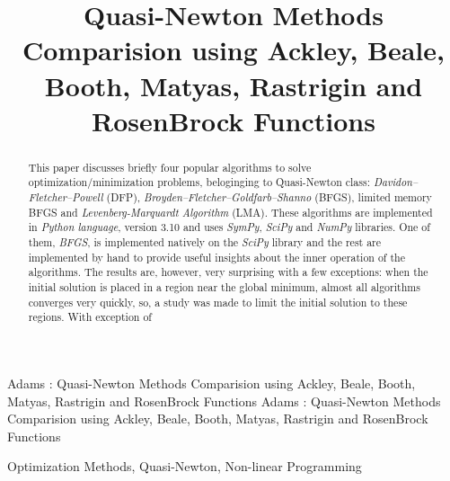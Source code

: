 \documentclass{ieeeaccess}
\begin{document}
\title{Quasi-Newton Methods Comparision using Ackley, Beale, Booth, Matyas, Rastrigin and RosenBrock Functions}
\author{
}

\markboth
{Adams \headeretal: Quasi-Newton Methods Comparision using Ackley, Beale, Booth, Matyas, Rastrigin and RosenBrock Functions}
{Adams \headeretal: Quasi-Newton Methods Comparision using Ackley, Beale, Booth, Matyas, Rastrigin and RosenBrock Functions}

\begin{abstract}
This paper discusses briefly four popular algorithms to solve optimization/minimization problems, beloginging to Quasi-Newton class: \textit{Davidon–Fletcher–Powell} (DFP), \textit{Broyden–Fletcher–Goldfarb–Shanno} (BFGS), limited memory BFGS and \textit{Levenberg-Marquardt Algorithm} (LMA). These algorithms are implemented in \textit{Python language}, version 3.10 and uses \textit{SymPy}, \textit{SciPy} and \textit{NumPy} libraries. One of them, \textit{BFGS}, is implemented natively on the  \textit{SciPy} library and the rest are implemented by hand to provide useful insights about the inner operation of the algorithms. The results are, however, very surprising with a few exceptions: when the initial solution is placed in a region near the global minimum, almost all algorithms converges very quickly, so, a study was made to limit the initial solution to  these regions. With exception of 
\end{abstract}

\begin{keywords} 
Optimization Methods, Quasi-Newton, Non-linear Programming
\end{keywords}

\titlepgskip=-15pt

\maketitle
\end{document}
